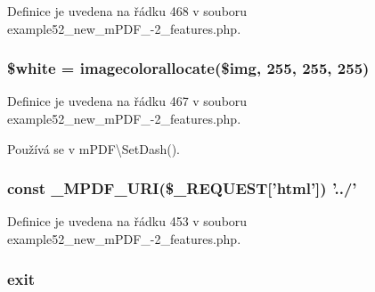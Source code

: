 Definice je uvedena na řádku 468 v souboru example52\-\_\-new\-\_\-m\-P\-D\-F\-\_-\/2\-\_\-features.\-php.

\hypertarget{example52__new__m_p_d_f__4-2__features_8php_af0ce1cc485d1d4ce996297ebe958c238}{
\subsubsection[{\$white}]{\setlength{\rightskip}{0pt plus 5cm}\$white = imagecolorallocate(\$img, 255, 255, 255)}}\label{example52__new__m_p_d_f__4-2__features_8php_af0ce1cc485d1d4ce996297ebe958c238}


Definice je uvedena na řádku 467 v souboru example52\-\_\-new\-\_\-m\-P\-D\-F\-\_-\/2\-\_\-features.\-php.



Používá se v m\-P\-D\-F\textbackslash{}\-Set\-Dash().

\hypertarget{example52__new__m_p_d_f__4-2__features_8php_a3e3768ecaefe46c02ea7e98145b50e3f}{
\subsubsection[{\-\_\-\-M\-P\-D\-F\-\_\-\-U\-R\-I}]{\setlength{\rightskip}{0pt plus 5cm}const \-\_\-\-M\-P\-D\-F\-\_\-\-U\-R\-I(\$\-\_\-\-R\-E\-Q\-U\-E\-S\-T\mbox{[}'html'\mbox{]}) '../'}}\label{example52__new__m_p_d_f__4-2__features_8php_a3e3768ecaefe46c02ea7e98145b50e3f}


Definice je uvedena na řádku 453 v souboru example52\-\_\-new\-\_\-m\-P\-D\-F\-\_-\/2\-\_\-features.\-php.

\hypertarget{example52__new__m_p_d_f__4-2__features_8php_a6733eb5f605d09eaede9845835d71c4e}{
\subsubsection[{exit}]{\setlength{\rightskip}{0pt plus 5cm}exit}}\label{example52__new__m_p_d_f__4-2__features_8php_a6733eb5f605d09eaede9845835d71c4e}


